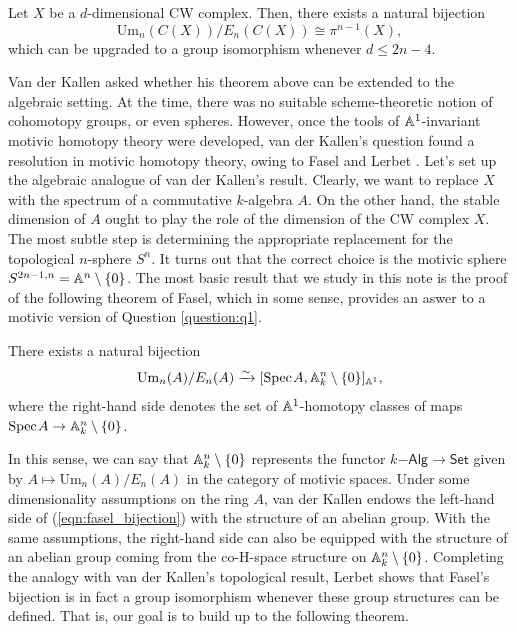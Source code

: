 \begin{theorem}\label{thm:vdk}
    Let $X$ be a $d$-dimensional CW complex. Then, there exists a natural bijection \[
\mathrm{Um}_n(C(X))/E_n(C(X)) \cong \pi^{n-1}(X),
\]
which can be upgraded to a group isomorphism whenever $d \leq 2n-4$.
\end{theorem}

Van der Kallen asked whether his theorem above can be extended to the algebraic setting. At the time, there was no suitable scheme-theoretic notion of cohomotopy groups, or even spheres. However, once the tools of $\mathbb{A}^1$-invariant motivic homotopy theory were developed, van der Kallen's question found a resolution in motivic homotopy theory, owing to Fasel \cite{Fasel-unim} and Lerbet \cite{Lerbet}. Let's set up the algebraic analogue of van der Kallen's result. Clearly, we want to replace $X$ with the spectrum of a commutative $k$-algebra $A$. On the other hand, the stable dimension of $A$ ought to play the role of the dimension of the CW complex $X$. The most subtle step is determining the appropriate replacement for the topological $n$-sphere $S^n$. It turns out that the correct choice is the motivic sphere $S^{2n-1,n} = \mathbb{A}^n \setminus \{0\}$. The most basic result that we study in this note is the proof of the following theorem of Fasel, which in some sense, provides an aswer to a motivic version of Question \ref{question:q1}.

\begin{theorem}[Fasel, 2010]\label{thm:fasel}
    There exists a natural bijection
    \begin{align}\label{eqn:fasel_bijection}\mathrm{Um}_n(A)/E_n(A) \xrightarrow{\sim} [\text{Spec}\hspace{0.1em} A, \mathbb{A}^n_k\setminus \{0\}]_{\mathbb{A}^1},\end{align} 
    where the right-hand side denotes the set of $\mathbb{A}^1$-homotopy classes of maps $\text{Spec}\hspace{0.1em} A \to \mathbb{A}^n_k \setminus\{0\}$.
\end{theorem}

In this sense, we can say that $\mathbb{A}^n_k \setminus\{0\}$ represents the functor $k\mathsf{-Alg} \to \mathsf{Set}$ given by $A \mapsto \mathrm{Um}_n(A)/E_n(A)$ in the category of motivic spaces. Under some dimensionality assumptions on the ring $A$, van der Kallen endows the left-hand side of (\ref{eqn:fasel_bijection}) with the structure of an abelian group. With the same assumptions, the right-hand side can also be equipped with the structure of an abelian group coming from the co-H-space structure on $\mathbb{A}_k^n\setminus\{0\}$. Completing the analogy with van der Kallen's topological result, Lerbet \cite{Lerbet} shows that Fasel's bijection is in fact a group isomorphism whenever these group structures can be defined. That is, our goal is to build up to the following theorem.

